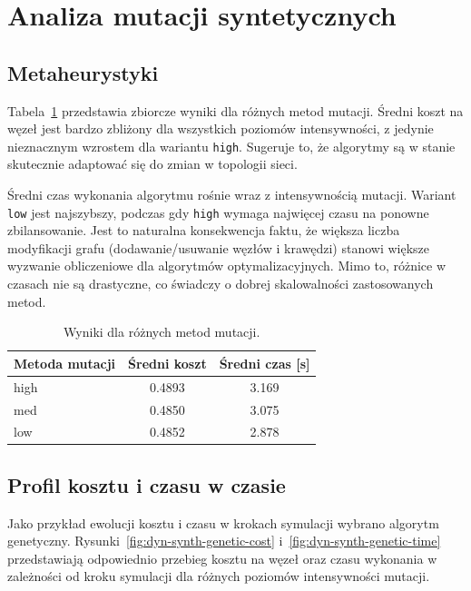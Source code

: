 \section{Analiza mutacji syntetycznych}
\subsection{Metaheurystyki}

Tabela~\ref{tab:dyn-synth-warm} przedstawia zbiorcze wyniki dla różnych metod mutacji. Średni koszt na węzeł jest bardzo zbliżony dla wszystkich poziomów intensywności, z jedynie nieznacznym wzrostem dla wariantu \texttt{high}. Sugeruje to, że algorytmy są w stanie skutecznie adaptować się do zmian w topologii sieci.

Średni czas wykonania algorytmu rośnie wraz z intensywnością mutacji. Wariant \texttt{low} jest najszybszy, podczas gdy \texttt{high} wymaga najwięcej czasu na ponowne zbilansowanie. Jest to naturalna konsekwencja faktu, że większa liczba modyfikacji grafu (dodawanie/usuwanie węzłów i krawędzi) stanowi większe wyzwanie obliczeniowe dla algorytmów optymalizacyjnych. Mimo to, różnice w czasach nie są drastyczne, co świadczy o dobrej skalowalności zastosowanych metod.

\begin{table}[H]
  \centering
  \caption{Wyniki dla różnych metod mutacji.}
  \label{tab:dyn-synth-warm}
  \begin{tabular}{lcc}
    \toprule
    \textbf{Metoda mutacji} & \textbf{Średni koszt} & \textbf{Średni czas [s]} \\
    \midrule
    high                    & 0.4893                & 3.169                    \\
    med                     & 0.4850                & 3.075                    \\
    low                     & 0.4852                & 2.878                    \\
    \bottomrule
  \end{tabular}
\end{table}

\subsection{Profil kosztu i czasu w czasie}
Jako przykład ewolucji kosztu i czasu w krokach symulacji wybrano algorytm genetyczny. Rysunki~\ref{fig:dyn-synth-genetic-cost} i~\ref{fig:dyn-synth-genetic-time} przedstawiają odpowiednio przebieg kosztu na węzeł oraz czasu wykonania w zależności od kroku symulacji dla różnych poziomów intensywności mutacji.

